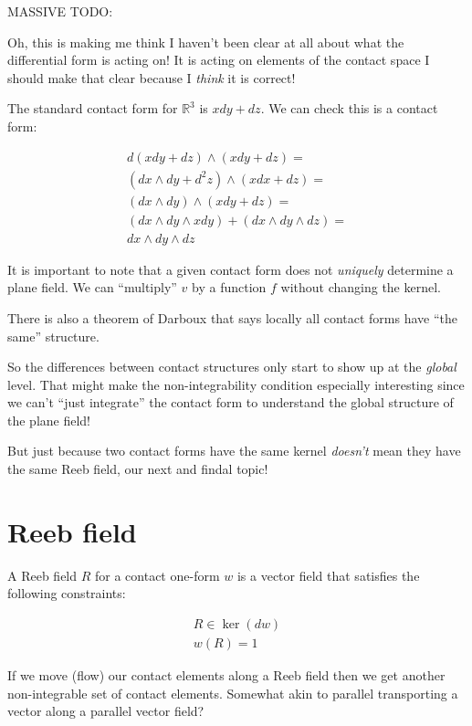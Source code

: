 \documentclass{article}
\begin{document}
MASSIVE TODO:

Oh, this is making me think I haven't been clear at all about what the
differential form is acting on! It is acting on elements of the contact space I
should make that clear because I \textit{think} it is correct!
  



  
The standard contact form for $\mathbb{R}^{3}$ is $xdy + dz$. We can check this
is a contact form:

\begin{align*}
  d (xdy + dz) \wedge (xdy + dz) = \\
  (dx \wedge dy + d^{2} z) \wedge (xdx + dz) = \\
  (dx \wedge dy) \wedge (xdy + dz) = \\
  (dx \wedge dy \wedge xdy) + (dx \wedge dy \wedge dz) = \\
  dx \wedge dy \wedge dz
\end{align*}

It is important to note that a given contact form does not \textit{uniquely}
determine a plane field. We can ``multiply'' $v$ by a function $f$ without
changing the kernel.

There is also a theorem of Darboux that says locally all contact forms have
``the same'' structure.

So the differences between contact structures only start to show up at the
\textit{global} level. That might make the non-integrability condition
especially interesting since we can't ``just integrate'' the contact form to understand
the global structure of the plane field!

But just because two contact forms have the same kernel \textit{doesn't} mean
they have the same Reeb field, our next and findal topic!

\section {Reeb field}

A Reeb field $R$ for a contact one-form $w$ is a vector field that satisfies the following constraints:

\begin{gather*}
  R \in \ker(dw) \\
  w(R) = 1
\end{gather*}
  
If we move (flow) our contact elements along a Reeb field then we get another
non-integrable set of contact elements. Somewhat akin to parallel transporting a
vector along a parallel vector field?
\end{document}
